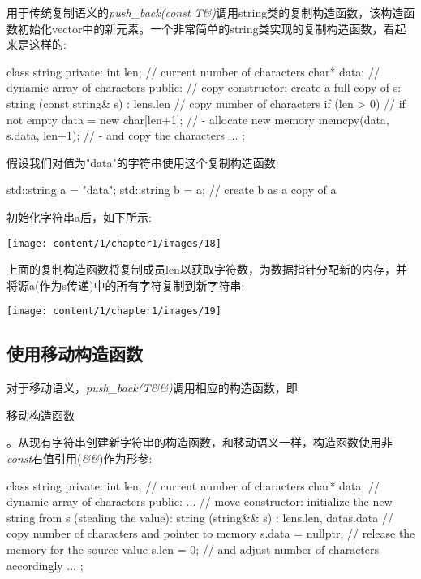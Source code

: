 用于传统复制语义的\textit{push_back(const T\&)}调用string类的复制构造函数，该构造函数初始化vector中的新元素。一个非常简单的string类实现的复制构造函数，看起来是这样的:

\begin{cppcode}
class string {
	private:
	int len; // current number of characters
	char* data; // dynamic array of characters
	public:
	// copy constructor: create a full copy of s:
	string (const string& s)
	: len{s.len} { // copy number of characters
		if (len > 0) { // if not empty
			data = new char[len+1]; // - allocate new memory
			memcpy(data, s.data, len+1); // - and copy the characters
		}
	}
	...
};
\end{cppcode}

假设我们对值为"data"的字符串使用这个复制构造函数:

\begin{cppcode}
std::string a = "data";
std::string b = a; // create b as a copy of a
\end{cppcode}

初始化字符串a后，如下所示:

\begin{center}
	\texttt{[image: content/1/chapter1/images/18]}
\end{center}

上面的复制构造函数将复制成员len以获取字符数，为数据指针分配新的内存，并将源a(作为s传递)中的所有字符复制到新字符串:

\begin{center}
	\texttt{[image: content/1/chapter1/images/19]}
\end{center}

\subsection{使用移动构造函数}

对于移动语义，\textit{push_back(T\&\&)}调用相应的构造函数，即\begin{cppcode}
移动构造函数
\end{cppcode}。从现有字符串创建新字符串的构造函数，和移动语义一样，构造函数使用非\textit{const}右值引用(\textit{\&\&})作为形参:

\begin{cppcode}
class string {
	private:
	int len; // current number of characters
	char* data; // dynamic array of characters
	public:
	...
	// move constructor: initialize the new string from s (stealing the value):
	string (string&& s)
	: len{s.len}, data{s.data} { // copy number of characters and pointer to memory
		s.data = nullptr; // release the memory for the source value
		s.len = 0; // and adjust number of characters accordingly
	}
	...
};
\end{cppcode}

